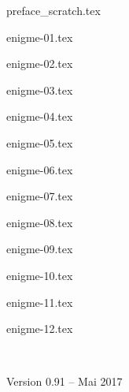 \documentclass[11pt]{report}
\begin{document}
\renewcommand{\contentsname}{Sommaire}

{preface_scratch.tex}

\debutchapitres


{enigme-01.tex}


{enigme-02.tex}

{enigme-03.tex}

{enigme-04.tex}

{enigme-05.tex}

{enigme-06.tex}

{enigme-07.tex}

{enigme-08.tex}

{enigme-09.tex}

{enigme-10.tex}

{enigme-11.tex}

{enigme-12.tex}


\newpage
\ 
\vfill



\bigskip
\bigskip
\vspace*{5cm}

\centerline{Version 0.91 -- Mai 2017}

\vspace*{1cm}
\end{document}
